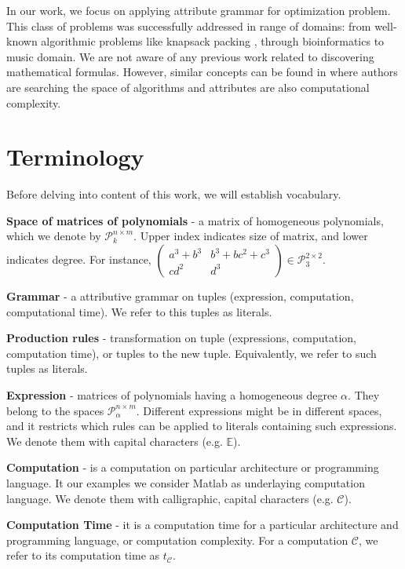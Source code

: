 \documentclass{article}
\begin{document}
In our work, we focus on applying attribute grammar for optimization problem. This class
of problems was successfully addressed in range of domains: from well-known algorithmic problems 
like knapsack packing \cite{o2004solving}, through bioinformatics \cite{waldispuhl2002approximate} to music domain\cite{desainte1994using}.
We are not aware of any previous work related to discovering mathematical formulas. However,
similar concepts can be found in \cite{cheung1999attribute} where authors are searching
the space of algorithms and attributes are also computational complexity.


\section{Terminology}
Before delving into content of this work, we will establish vocabulary.


{\bf Space of matrices of polynomials} - a matrix of homogeneous polynomials, which we denote by $\mathcal{P}^{n \times m}_k$. Upper index indicates size of matrix, and lower indicates degree. For instance, $\begin{pmatrix} a^3 + b^3 & b^3 + bc^2 + c^3\\ cd^2 & d^3 \end{pmatrix} \in \mathcal{P}^{2 \times 2}_3$. 


{\bf Grammar} - a attributive grammar on tuples (expression, computation, computational time). We refer to this tuples as literals. 


{\bf Production rules} - transformation on tuple (expressions, computation, computation time), or tuples to the new tuple. Equivalently, we refer to such tuples as literals. 


{\bf Expression} - matrices of polynomials having a homogeneous degree $\alpha$. They belong to the spaces $\mathcal{P}^{n \times m}_\alpha$. Different expressions might be in different spaces, and it restricts which rules can be 
applied to literals containing such expressions. We denote them with capital characters (e.g. $\mathbb{E}$).


{\bf Computation} - is a computation on particular architecture or programming language. It our examples we consider Matlab as underlaying computation language. We denote them with calligraphic, capital characters (e.g. $\mathcal{C}$).


{\bf Computation Time} - it is a computation time for a particular architecture and programming language, or computation complexity. For a computation $\mathcal{C}$, we refer to its computation time as $t_{\mathcal{C}}$. 
\end{document}
